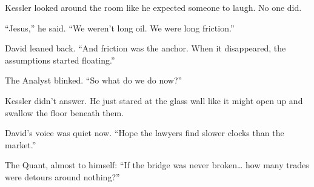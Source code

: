 Kessler looked around the room like he expected someone to laugh. No one did.

“Jesus,” he said. “We weren’t long oil. We were long friction.”

David leaned back. “And friction was the anchor. When it disappeared, the assumptions started floating.”

The Analyst blinked. “So what do we do now?”

Kessler didn’t answer. He just stared at the glass wall like it might open up and swallow the floor beneath them.

David’s voice was quiet now. “Hope the lawyers find slower clocks than the market.”

The Quant, almost to himself: “If the bridge was never broken… how many trades were detours around nothing?”

